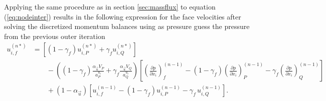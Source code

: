 Applying the same procedure as in section \ref{sec:massflux} to equation (\ref{eq:nodeinter}) results in the following expression for the face velocities after solving the discretized momentum balances using as pressure guess the pressure from the previous outer iteration
\begin{align}
  \label{eq:faceinter}
  u_{i,f}^{(n*)} 
  &=
  \left[\left(1 - \gamma_f\right) u_{i,P}^{(n*)} + \gamma_f u_{i,Q}^{(n*)} \right] \nonumber \\[1em]
  &\quad\quad - 
  \left(\left(1 - \gamma_f\right) \frac{\alpha_\vec{u} V_P}{a_P^{u_i}} + \gamma_f \frac{\alpha_\vec{u} V_Q}{a_Q^{u_i}}\right)
  \left[ 
  \left(\frac{\partial p}{\partial x_i}\right)_f^{(n-1)} 
  - \left( 1 - \gamma_f \right) \left( \frac{\partial p}{\partial x_i} \right)_P^{(n-1)} 
  - \gamma_f \left(\frac{\partial p}{\partial x_i}\right)_Q^{(n-1)}
  \right] \nonumber \\[1em]
  &\quad\quad + \left(1 - \alpha_\vec{u}\right) \left[ u_{i,f}^{(n-1)} - \left(1 - \gamma_f\right) u_{i,P}^{(n-1)} - \gamma_f \, u_{i,Q}^{(n-1)} \right].
\end{align}

